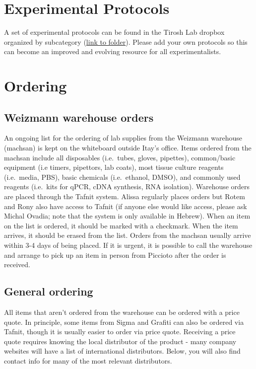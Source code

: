 \documentclass[]{book}
\begin{document}
\chapter{Experimental Protocols}\label{protocols}

A set of experimental protocols can be found in the Tirosh Lab dropbox
organized by subcategory
(\href{https://www.dropbox.com/sh/javjoi26i5k5f6t/AADAX4RgSZUFuBwtS6TRE3wua?dl=0}{link
to folder}). Please add your own protocols so this can become an
improved and evolving resource for all experimentalists.

\chapter{Ordering}\label{ordering}

\section{Weizmann warehouse orders}\label{weizmann-warehouse-orders}

An ongoing list for the ordering of lab supplies from the Weizmann
warehouse (machsan) is kept on the whiteboard outside Itay's office.
Items ordered from the machsan include all disposables (i.e.~tubes,
gloves, pipettes), common/basic equipment (i.e timers, pipettors, lab
coats), most tissue culture reagents (i.e.~media, PBS), basic chemicals
(i.e.~ethanol, DMSO), and commonly used reagents (i.e.~kits for qPCR,
cDNA synthesis, RNA isolation). Warehouse orders are placed through the
Tafnit system. Alissa regularly places orders but Rotem and Rony also
have access to Tafnit (if anyone else would like access, please ask
Michal Ovadia; note that the system is only available in Hebrew). When
an item on the list is ordered, it should be marked with a checkmark.
When the item arrives, it should be erased from the list. Orders from
the machsan usually arrive within 3-4 days of being placed. If it is
urgent, it is possible to call the warehouse and arrange to pick up an
item in person from Piccioto after the order is received.

\section{General ordering}\label{general-ordering}

All items that aren't ordered from the warehouse can be ordered with a
price quote. In principle, some items from Sigma and Grafiti can also be
ordered via Tafnit, though it is usually easier to order via price
quote. Receiving a price quote requires knowing the local distributor of
the product - many company websites will have a list of international
distributors. Below, you will also find contact info for many of the
most relevant distributors.
\end{document}
